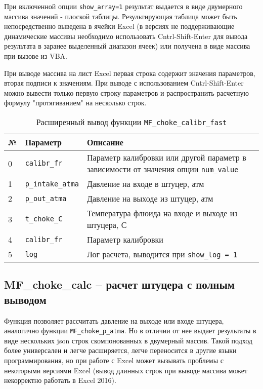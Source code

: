 При включенной опции \texttt{show_array=1} результат выдается в виде двумерного массива значений - плоской таблицы. Результирующая таблица может быть непосредственно выведена в ячейки Excel (в версиях не поддерживающие динамические массивы необходимо использовать Cntrl-Shift-Enter для вывода результата в заранее выделенный диапазон ячеек) или получена в виде массива при вызове из VBA.

При выводе массива на лист Excel первая строка содержит значения параметров, вторая подписи к значениям. При выводе с использованием Cntrl-Shift-Enter можно вывести только первую строку параметров и распространить расчетную формулу "протягиванием" на несколько строк.

\begin{table}[H]
	\caption{Расширенный вывод функции \texttt{MF_choke_calibr_fast}}
	\label{table:res_list_choke_calibr_fast}
	\begin{tabular}{p{}p{}p{}}
		\hline
		№& Параметр & Описание  \\ \hline
		0 & \texttt{calibr_fr} & Параметр калибровки или другой параметр в зависимости от значения опции 	\texttt{num_value}     \\ \hline
		
		1 & \texttt{p_intake_atma} & Давление на входе в штуцер, атм    \\ \hline
		2 & \texttt{p_out_atma} & Давление на выходе из штуцер, атм    \\ \hline
		3 & \texttt{t_choke_C} & Температура флюида на входе и выходе из штуцера, С  \\ \hline
		
		4 & \texttt{calibr_fr} & Параметр калибровки    \\ \hline
		
		5 & \texttt{log} & Лог расчета, выводится при \texttt{show_log = 1}  \\ \hline
		
	\end{tabular}
\end{table}

\subsection{MF\_choke\_calc – расчет штуцера с полным выводом}
Функция позволяет рассчитать давление на выходе или входе штуцера, аналогично функции \texttt{MF_choke_p_atma}. Но в отличии от нее выдает результаты в виде нескольких json строк скомпонованных в двумерный массив. Такой подход более универсален и легче расширяется, легче переносится в другие языки программирования, но при работе с Excel может вызывать проблемы с некоторыми версиями Excel (вывод длинных строк при выводе массива может некорректно работать в Excel 2016).


